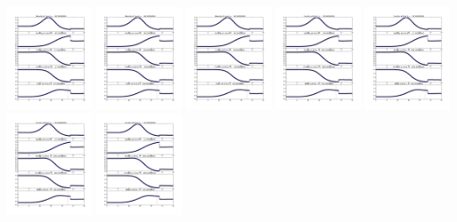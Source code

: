\documentclass[11pt]{article}
\begin{document}
\vskip 10pt 
\includegraphics[width=0.19\textwidth]{frame0097fig1.png}
\vskip 10pt 
\includegraphics[width=0.19\textwidth]{frame0098fig1.png}
\vskip 10pt 
\includegraphics[width=0.19\textwidth]{frame0099fig1.png}
\vskip 10pt 
\includegraphics[width=0.19\textwidth]{frame0100fig1.png}
\vskip 10pt 
\includegraphics[width=0.19\textwidth]{frame0101fig1.png}
\vskip 10pt 
\includegraphics[width=0.19\textwidth]{frame0102fig1.png}
\vskip 10pt 
\includegraphics[width=0.19\textwidth]{frame0103fig1.png}
\end{document}
